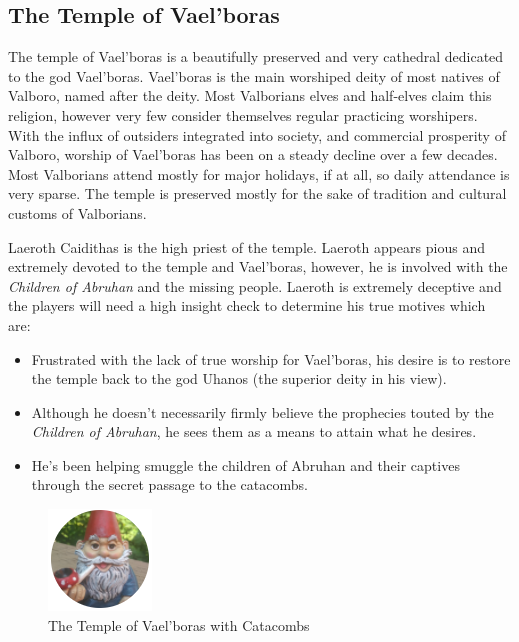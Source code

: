 \begin{multicols*}{2}
\subsection{The Temple of Vael'boras}
The temple of Vael'boras is a beautifully preserved and very cathedral dedicated to the god Vael'boras. Vael'boras is the main worshiped deity of most natives of Valboro, named after the deity. Most Valborians elves and half-elves claim this religion, however very few consider themselves regular practicing worshipers. With the influx of outsiders integrated into society, and commercial prosperity of Valboro, worship of Vael'boras has been on a steady decline over a few decades. Most Valborians attend mostly for major holidays, if at all, so daily attendance is very sparse. The temple is preserved mostly for the sake of tradition and cultural customs of Valborians.

Laeroth Caidithas is the high priest of the temple. Laeroth appears pious and extremely devoted to the temple and Vael'boras, however, he is involved with the \emph{Children of Abruhan} and the missing people. Laeroth is extremely deceptive and the players will need a high insight check to determine his true motives which are:

\begin{itemize}
	\item Frustrated with the lack of true worship for Vael'boras, his desire is to restore the temple back to the god Uhanos (the superior deity in his view).
	\item Although he doesn't necessarily firmly believe the prophecies touted by the \emph{Children of Abruhan}, he sees them as a means to attain what he desires.
	\item He's been helping smuggle the children of Abruhan and their captives through the secret passage to the catacombs.   
\end{itemize}

\begin{figure}
	\centering
	\includegraphics[]{images/placeholder}
	\caption{The Temple of Vael'boras with Catacombs}
\end{figure}


\end{multicols*}
